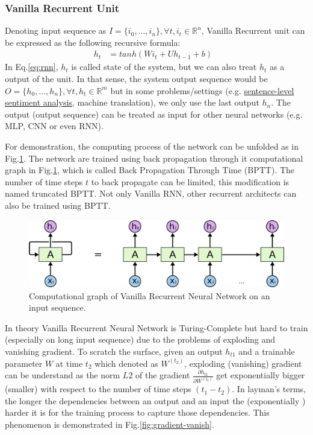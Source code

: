 \subsubsection{Vanilla Recurrent Unit}\label{sec:vanilla-rnn}
Denoting input sequence as \(I = \{i_0,\ldots,i_n\}, \forall t, i_t \in \mathbb{R}^n\), Vanilla Recurrent unit can be expressed as the following recursive formula\cite{treeLSTM}:
\begin{align}
  	h_t &= tanh(Wi_t + Uh_{t-1} + b)&\label{eq:rnn}
\end{align}
In Eq.\ref{eq:rnn}, \(h_t\) is called state of the system\cite{deeplearning-book}, but we can also treat \(h_t\) as a output of the unit.  
In that sense, the system output sequence would be \(O = \{h_0,\ldots,h_n\}, \forall t, h_t \in \mathbb{R}^m\) but in some problems/settings (e.g. \hyperref[sec:sent-level]{sentence-level sentiment analysis}, machine translation\cite{SutskeverVL14}), we only use the last output \(h_n\).
The output (output sequence) can be treated as input for other neural networks (e.g. MLP, CNN or even RNN).
 
For demonstration, the computing process of the network can be unfolded as in Fig.\ref{fig:rnn-unfold}. 
The network are trained using back propagation through it computational graph in Fig.\ref{fig:rnn-unfold}, which is called Back Propagation Through Time (BPTT)\cite{BPTT}. 
The number of time steps \(t\) to back propagate can be limited, this modification is named truncated BPTT\cite{truncatedBPTT}. 
Not only Vanilla RNN, other recurrent architects can also be trained using BPTT.

\begin{figure}[H]
	\centering
	\includegraphics[scale=0.4]{figure/rnn-unroll}
	\caption{Computational graph of Vanilla Recurrent Neural Network on an input sequence\cite{colah-lsmt}.}
	\label{fig:rnn-unfold}
\end{figure}

In theory Vanilla Recurrent Neural Network is Turing-Complete\cite{rnn-turing-complete} but  hard to train (especially on long input sequence) due to the problems of exploding and vanishing gradient\cite{Bengio1994}. 
To scratch the surface, given an output \(h_{t1}\) and a trainable parameter \(W\) at time \(t_2\) which denoted as \(W^{(t_2)}\),  exploding (vanishing) gradient can be understand as the norm \(L2\) of the gradient \(\frac{\partial h_{t1}}{\partial W^{(t_2)}}\) get exponentially bigger (smaller) with respect to the number of time steps \((t_1-t_2)\)\cite{Bengio1994}.
In layman's terms, the longer the dependencies between an output and an input the (exponentially ) harder it is for the training process to capture those dependencies.
This phenomenon is demonstrated in Fig.\ref{fig:gradient-vanish}. 

